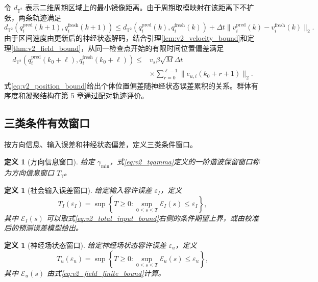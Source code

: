 \documentclass[UTF8,fontset=windows,11pt]{ctexart}
\newtheorem{definition}[theorem]{定义}
\newcommand{\Ttwo}{\mathbb T^2}
\begin{document}
令 $d_{\Ttwo}$ 表示二维周期区域上的最小镜像距离。由于周期取模映射在该距离下不扩张，两条轨迹满足
\begin{equation}
 d_{\Ttwo}(q_i^{\mathrm{pred}}(k+1),q_i^{\mathrm{fresh}}(k+1))
 \le d_{\Ttwo}(q_i^{\mathrm{pred}}(k),q_i^{\mathrm{fresh}}(k))
 +\Delta t\|v_i^{\mathrm{pred}}(k)-v_i^{\mathrm{fresh}}(k)\|_2.
 \label{eq:v2_position_step}
\end{equation}
由于区间速度由更新后的神经状态解码，结合引理\ref{lem:v2_velocity_bound}和定理\ref{thm:v2_field_bound}，从同一检查点开始的有限时间位置偏差满足
\begin{equation}
 \begin{aligned}
 d_{\Ttwo}(q_i^{\mathrm{pred}}(k_0+\ell),q_i^{\mathrm{fresh}}(k_0+\ell))
 \le{}&v_s\beta\sqrt M\Delta t\\
 &\times\sum_{r=0}^{\ell-1}\|e_{u,i}(k_0+r+1)\|_2.
 \end{aligned}
 \label{eq:v2_position_bound}
\end{equation}
式\eqref{eq:v2_position_bound}给出个体位置偏差随神经状态误差累积的关系。群体有序度和凝聚结构在第 5 章通过配对轨迹评价。

\subsection{三类条件有效窗口}

按方向信息、输入误差和神经状态偏差，定义三类条件窗口。

\begin{definition}[方向信息窗口]
\label{def:v2_direction_window}
给定 $\gamma_{\min}$，式\eqref{eq:v2_tgamma}定义的一阶谐波保留窗口称为方向信息窗口 $T_\gamma$。
\end{definition}

\begin{definition}[社会输入误差窗口]
\label{def:v2_input_window}
给定输入容许误差 $\varepsilon_I$，定义
\begin{equation}
 T_I(\varepsilon_I)=\sup\left\{T\ge0:
 \sup_{0\le s\le T}\mathcal E_I(s)\le\varepsilon_I\right\},
 \label{eq:v2_input_window}
\end{equation}
其中 $\mathcal E_I(s)$ 可以取式\eqref{eq:v2_total_input_bound}右侧的条件期望上界，或由校准后的预测误差模型给出。
\end{definition}

\begin{definition}[神经场状态窗口]
\label{def:v2_field_window}
给定神经场状态容许误差 $\varepsilon_u$，定义
\begin{equation}
 T_u(\varepsilon_u)=\sup\left\{T\ge0:
 \sup_{0\le s\le T}\mathcal E_u(s)\le\varepsilon_u\right\},
 \label{eq:v2_field_window}
\end{equation}
其中 $\mathcal E_u(s)$ 由式\eqref{eq:v2_field_finite_bound}计算。
\end{definition}
\end{document}
